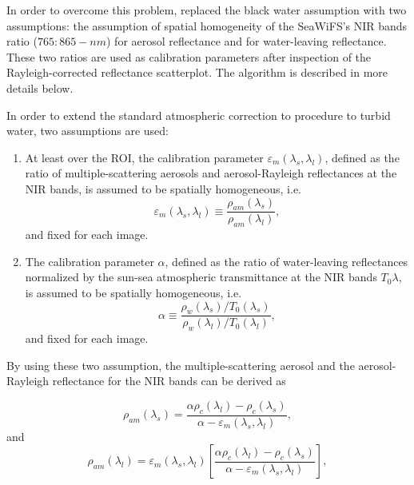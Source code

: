 In order to overcome this problem, \cite{Ruddick:2000bs} replaced the black water assumption with two assumptions: the assumption of spatial homogeneity of the SeaWiFS's NIR bands ratio ($765:865-nm$) for aerosol reflectance and for water-leaving reflectance. These two ratios are used as calibration parameters after inspection of the Rayleigh-corrected reflectance scatterplot. The algorithm is described in more details below.

In order to extend the standard atmospheric correction to procedure to turbid water, two assumptions are used:

\begin{enumerate}[itemsep=2pt,parsep=2pt]
  \item At least over the ROI, the calibration parameter $\varepsilon_m(\lambda_s,\lambda_l)$, defined as the ratio of multiple-scattering aerosols and aerosol-Rayleigh reflectances at the NIR bands, is assumed to be spatially homogeneous, i.e.
  \begin{equation}\label{eq:rhohomo}
    \varepsilon_m(\lambda_s,\lambda_l)\equiv \frac{\rho_{am}(\lambda_s)}{\rho_{am}(\lambda_l)},
  \end{equation}
  and fixed for each image.

  \item The calibration parameter $\alpha$, defined as the ratio of water-leaving reflectances normalized by the sun-sea atmospheric transmittance at the NIR bands $T_0{\lambda}$, is assumed to be spatially homogeneous, i.e.
  \begin{equation}\label{eq:alpha}
    \alpha \equiv \frac{\rho_w(\lambda_s)/T_0(\lambda_s)}{\rho_w(\lambda_l)/T_0(\lambda_l)},
  \end{equation}
  and fixed for each image.
\end{enumerate}

By using these two assumption, the multiple-scattering aerosol and the aerosol-Rayleigh reflectance for the NIR bands can be derived as

\begin{equation}\label{eq:rhoams}
  \rho_{am}(\lambda_s) = \frac{\alpha\rho_c(\lambda_l)-\rho_c(\lambda_s)}{\alpha-\varepsilon_m(\lambda_s,\lambda_l)},
\end{equation}
and
\begin{equation}\label{eq:rhoaml}
  \rho_{am}(\lambda_l) = \varepsilon_m(\lambda_s,\lambda_l)\left[\frac{\alpha\rho_c(\lambda_l)-\rho_c(\lambda_s)}{\alpha-\varepsilon_m(\lambda_s,\lambda_l)}\right],
\end{equation}


